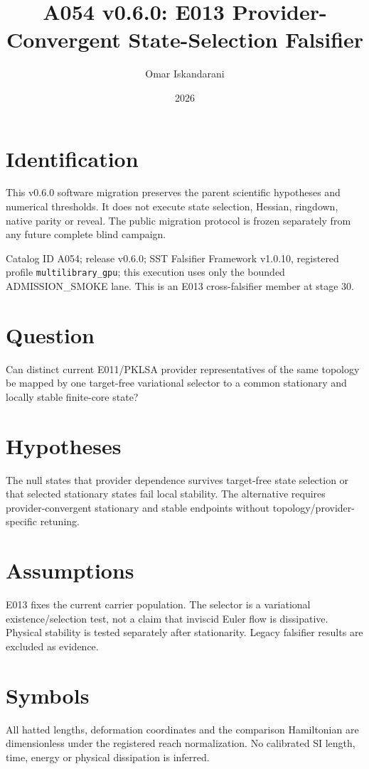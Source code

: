 \documentclass[11pt]{article}
\title{A054 v0.6.0: E013 Provider-Convergent State-Selection Falsifier}
\author{Omar Iskandarani}
\date{2026}
\begin{document}
\maketitle
\section{Identification}
This v0.6.0 software migration preserves the parent scientific hypotheses and numerical thresholds. It does not execute state selection, Hessian, ringdown, native parity or reveal. The public migration protocol is frozen separately from any future complete blind campaign.

Catalog ID A054; release v0.6.0; SST Falsifier Framework v1.0.10, registered profile \texttt{multilibrary\_gpu}; this execution uses only the bounded ADMISSION\_SMOKE lane. This is an E013 cross-falsifier member at stage 30.
\section{Question}
Can distinct current E011/PKLSA provider representatives of the same topology be mapped by one target-free variational selector to a common stationary and locally stable finite-core state?
\section{Hypotheses}
The null states that provider dependence survives target-free state selection or that selected stationary states fail local stability. The alternative requires provider-convergent stationary and stable endpoints without topology/provider-specific retuning.
\section{Assumptions}
E013 fixes the current carrier population. The selector is a variational existence/selection test, not a claim that inviscid Euler flow is dissipative. Physical stability is tested separately after stationarity. Legacy falsifier results are excluded as evidence.
\section{Symbols}
All hatted lengths, deformation coordinates and the comparison Hamiltonian are dimensionless under the registered reach normalization. No calibrated SI length, time, energy or physical dissipation is inferred.
\end{document}
